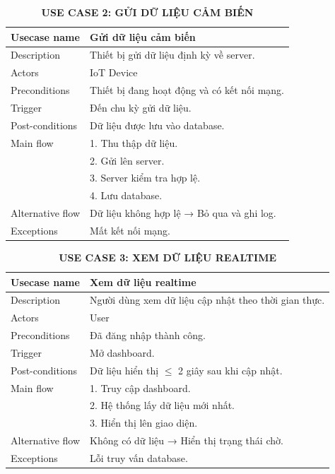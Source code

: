 \begin{table}[H]
\centering
\captionsetup{justification=centering}
\caption*{\textbf{USE CASE 2: GỬI DỮ LIỆU CẢM BIẾN}}
\renewcommand{\arraystretch}{1.3}
\begin{tabular}{|p{4cm}|p{11cm}|}
\hline
Usecase name & Gửi dữ liệu cảm biến \\
\hline
Description & Thiết bị gửi dữ liệu định kỳ về server. \\
\hline
Actors & IoT Device \\
\hline
Preconditions & Thiết bị đang hoạt động và có kết nối mạng. \\
\hline
Trigger & Đến chu kỳ gửi dữ liệu. \\
\hline
Post-conditions & Dữ liệu được lưu vào database. \\
\hline
Main flow & 
1. Thu thập dữ liệu.\\ &
2. Gửi lên server.\\ & 
3. Server kiểm tra hợp lệ.\\ &
4. Lưu database. \\
\hline
Alternative flow & Dữ liệu không hợp lệ → Bỏ qua và ghi log. \\
\hline
Exceptions & Mất kết nối mạng. \\
\hline
\end{tabular}
\end{table}
\begin{table}[H]
\centering
\captionsetup{justification=centering}
\caption*{\textbf{USE CASE 3: XEM DỮ LIỆU REALTIME}}
\renewcommand{\arraystretch}{1.3}
\begin{tabular}{|p{4cm}|p{11cm}|}
\hline
Usecase name & Xem dữ liệu realtime \\
\hline
Description & Người dùng xem dữ liệu cập nhật theo thời gian thực. \\
\hline
Actors & User \\
\hline
Preconditions & Đã đăng nhập thành công. \\
\hline
Trigger & Mở dashboard. \\
\hline
Post-conditions & Dữ liệu hiển thị $\le$ 2 giây sau khi cập nhật. \\
\hline
Main flow & 
1. Truy cập dashboard.\\ &
2. Hệ thống lấy dữ liệu mới nhất.\\ &
3. Hiển thị lên giao diện. \\
\hline
Alternative flow & Không có dữ liệu → Hiển thị trạng thái chờ. \\
\hline
Exceptions & Lỗi truy vấn database. \\
\hline
\end{tabular}
\end{table}
